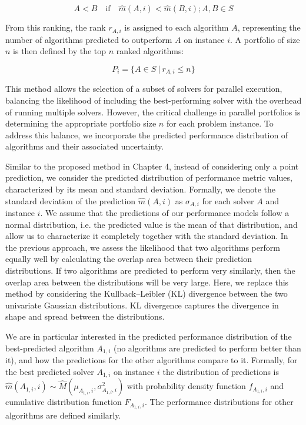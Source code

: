 \[
A < B \quad \text{if} \quad \hat{m}(A, i) < \hat{m}(B, i); A, B \in S
\]

From this ranking, the rank \(r_{A, i}\) is assigned to each algorithm \(A\), representing the number of algorithms predicted to outperform \(A\) on instance \(i\). A portfolio of size \(n\) is then defined by the top \(n\) ranked algorithms:

\[
P_i = \{A \in S \: | \: r_{A,i} \leq n\}
\]

This method allows the selection of a subset of solvers for parallel execution, balancing the likelihood of including the best-performing solver with the overhead of running multiple solvers. However, the critical challenge in parallel portfolios is determining the appropriate portfolio size $n$ for each problem instance. To address this balance, we incorporate the predicted performance distribution of algorithms and their associated uncertainty. 

Similar to the proposed method in Chapter 4, instead of considering only a point prediction, we consider the predicted distribution of performance metric values, characterized by its mean and standard deviation. Formally, we denote the standard deviation of the prediction \begin{math}\hat{m}(A, i)\end{math} as \begin{math}\sigma_{A, i}\end{math} for each solver $A$ and instance $i$. We assume that the predictions of our performance models follow a normal distribution, i.e. the predicted value is the mean of that distribution, and allow us to characterize it completely together with the standard deviation. In the previous approach, we assess the likelihood that two algorithms perform equally well by calculating the overlap area between their prediction distributions. If two algorithms are predicted to perform very similarly, then the overlap area between the distributions will be very large. Here, we replace this method by considering the Kullback–Leibler (KL) divergence between the two univariate Gaussian distributions. KL divergence captures the divergence in shape and spread between the distributions.

We are in particular interested in the predicted performance distribution of the best-predicted algorithm $A_{1,i}$ (no algorithms are predicted to perform better than it), and how the predictions for the other algorithms compare to it. Formally, for the best predicted solver $A_{1,i}$ on instance $i$ the distribution of predictions is \begin{math} \hat{m}(A_{1,i}, i) \sim \hat{M}(\mu_{A_{1,i},i}, \sigma^2_{A_{1,i},i}) \end{math} with probability density function \begin{math} f_{A_{1,i},i}\end{math} and cumulative distribution function \begin{math} F_{A_{1,i},i}\end{math}. The performance distributions for other algorithms are defined similarly.

